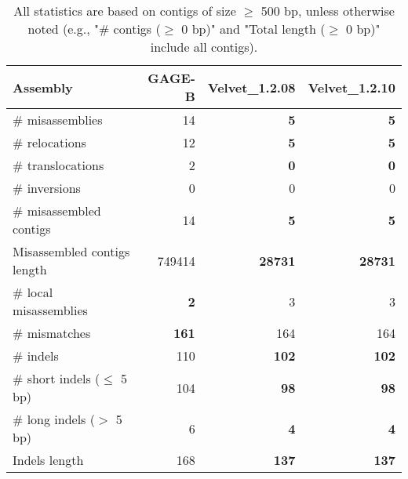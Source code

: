 \documentclass[12pt,a4paper]{article}
\begin{document}
\begin{table}[ht]
\begin{center}
\caption{All statistics are based on contigs of size $\geq$ 500 bp, unless otherwise noted (e.g., "\# contigs ($\geq$ 0 bp)" and "Total length ($\geq$ 0 bp)" include all contigs).}
\begin{tabular}{|l*{3}{|r}|}
\hline
Assembly & GAGE-B & Velvet\_1.2.08 & Velvet\_1.2.10 \\ \hline
\# misassemblies & 14 & {\bf 5} & {\bf 5} \\ \hline
\hspace{5mm}\# relocations & 12 & {\bf 5} & {\bf 5} \\ \hline
\hspace{5mm}\# translocations & 2 & {\bf 0} & {\bf 0} \\ \hline
\hspace{5mm}\# inversions & 0 & 0 & 0 \\ \hline
\# misassembled contigs & 14 & {\bf 5} & {\bf 5} \\ \hline
Misassembled contigs length & 749414 & {\bf 28731} & {\bf 28731} \\ \hline
\# local misassemblies & {\bf 2} & 3 & 3 \\ \hline
\# mismatches & {\bf 161} & 164 & 164 \\ \hline
\# indels & 110 & {\bf 102} & {\bf 102} \\ \hline
\hspace{5mm}\# short indels ($\leq$ 5 bp) & 104 & {\bf 98} & {\bf 98} \\ \hline
\hspace{5mm}\# long indels ($>$ 5 bp) & 6 & {\bf 4} & {\bf 4} \\ \hline
Indels length & 168 & {\bf 137} & {\bf 137} \\ \hline
\end{tabular}
\end{center}
\end{table}
\end{document}
